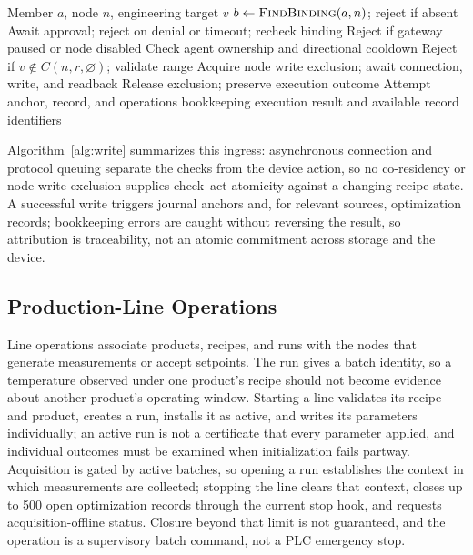 \begin{algorithm}[!t]
\caption{Ordinary bound-agent setpoint request}
\label{alg:write}
\begin{algorithmic}[1]
\Require Member $a$, node $n$, engineering target $v$
\State $b\gets\textsc{FindBinding}(a,n)$; reject if absent
  \State Await approval; reject on denial or timeout; recheck binding
\EndIf
\State Reject if gateway paused or node disabled
\State Check agent ownership and directional cooldown
\State Reject if $v\notin C(n,r,\varnothing)$; validate range
\State Acquire node write exclusion; await connection, write, and readback
\State Release exclusion; preserve execution outcome
  \State Attempt anchor, record, and operations bookkeeping
\EndIf
\State \Return execution result and available record identifiers
\end{algorithmic}
\end{algorithm}

Algorithm~\ref{alg:write} summarizes this ingress: asynchronous connection and
protocol queuing separate the checks from the device action, so no co-residency or
node write exclusion supplies check--act atomicity against a changing recipe state.
A successful write triggers journal anchors and, for relevant sources,
optimization records; bookkeeping errors are caught without reversing the result,
so attribution is traceability, not an atomic commitment across storage and the
device.

\subsection{Production-Line Operations}
\label{sec:lineops}
Line operations associate products, recipes, and runs with the nodes that generate
measurements or accept setpoints. The run gives a batch identity, so a temperature
observed under one product's recipe should not become evidence about another
product's operating window. Starting a line validates its recipe and product,
creates a run, installs it as active, and writes its parameters individually; an
active run is not a certificate that every parameter applied, and individual
outcomes must be examined when initialization fails partway. Acquisition is gated
by active batches, so opening a run establishes the context in which measurements
are collected; stopping the line clears that context, closes up to 500 open
optimization records through the current stop hook, and requests
acquisition-offline status. Closure beyond that limit is not guaranteed, and the
operation is a supervisory batch command, not a PLC emergency stop.

